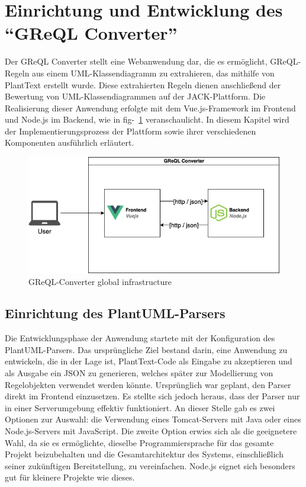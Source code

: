 \section{Einrichtung und Entwicklung des ``\gls{GReQL Converter}''}\label{sec:greql-converter}

Der \gls{GReQL Converter} stellt eine Webanwendung dar, die es ermöglicht, GReQL-Regeln aus einem UML-Klassendiagramm zu
extrahieren, das mithilfe von PlantText erstellt wurde. Diese extrahierten Regeln dienen anschließend der Bewertung
von UML-Klassendiagrammen auf der JACK-Plattform. Die Realisierung dieser Anwendung erfolgte mit dem Vue.js-Framework
im Frontend und Node.js im Backend, wie in fig-~\ref{fig:infrastructure} veranschaulicht. In diesem Kapitel wird der
Implementierungsprozess der Plattform sowie ihrer verschiedenen Komponenten ausführlich erläutert.

\begin{figure}[h]
    \centering
    \includegraphics[width=15cm]{images/infrastucture}
    \caption{GReQL-Converter global infrastructure}
    \label{fig:infrastructure}
\end{figure}

\subsection{Einrichtung des PlantUML-Parsers}\label{subsec:einrichtung-des-plantuml-parsers}

Die Entwicklungsphase der Anwendung startete mit der Konfiguration des PlantUML-Parsers. Das ursprüngliche Ziel bestand
darin, eine Anwendung zu entwickeln, die in der Lage ist, PlantText-Code als Eingabe zu akzeptieren und als Ausgabe ein
JSON zu generieren, welches später zur Modellierung von Regelobjekten verwendet werden könnte. Ursprünglich war geplant,
den Parser direkt im Frontend einzusetzen. Es stellte sich jedoch heraus, dass der Parser nur in einer Serverumgebung
effektiv funktioniert. An dieser Stelle gab es zwei Optionen zur Auswahl: die Verwendung eines Tomcat-Servers mit Java
oder eines Node.js-Servers mit JavaScript. Die zweite Option erwies sich als die geeignetere Wahl, da sie es ermöglichte,
dieselbe Programmiersprache für das gesamte Projekt beizubehalten und die Gesamtarchitektur des Systems, einschließlich
seiner zukünftigen Bereitstellung, zu vereinfachen. Node.js eignet sich besonders gut für kleinere Projekte wie dieses.

